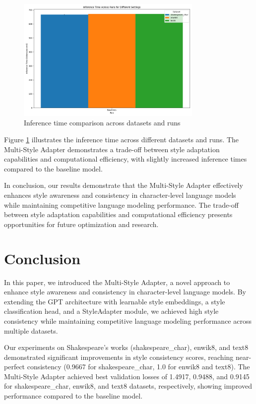 \documentclass{article} %
\begin{document}
\begin{figure}[h]
    \centering
    \includegraphics[width=0.8\textwidth]{inf_time_grouped.png}
    \caption{Inference time comparison across datasets and runs}
    \label{fig:inf_time}
\end{figure}

Figure \ref{fig:inf_time} illustrates the inference time across different datasets and runs. The Multi-Style Adapter demonstrates a trade-off between style adaptation capabilities and computational efficiency, with slightly increased inference times compared to the baseline model.

In conclusion, our results demonstrate that the Multi-Style Adapter effectively enhances style awareness and consistency in character-level language models while maintaining competitive language modeling performance. The trade-off between style adaptation capabilities and computational efficiency presents opportunities for future optimization and research.

\section{Conclusion}
\label{sec:conclusion}

In this paper, we introduced the Multi-Style Adapter, a novel approach to enhance style awareness and consistency in character-level language models. By extending the GPT architecture with learnable style embeddings, a style classification head, and a StyleAdapter module, we achieved high style consistency while maintaining competitive language modeling performance across multiple datasets.

Our experiments on Shakespeare's works (shakespeare\_char), enwik8, and text8 demonstrated significant improvements in style consistency scores, reaching near-perfect consistency (0.9667 for shakespeare\_char, 1.0 for enwik8 and text8). The Multi-Style Adapter achieved best validation losses of 1.4917, 0.9488, and 0.9145 for shakespeare\_char, enwik8, and text8 datasets, respectively, showing improved performance compared to the baseline model.
\end{document}
